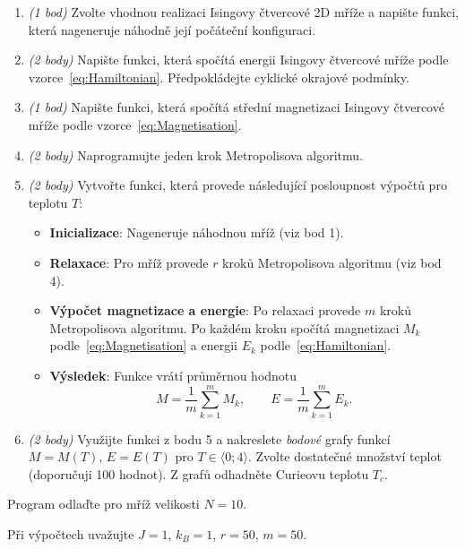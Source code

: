 \documentclass[a4paper,11pt,twoside]{article}
\begin{document}
\begin{enumerate}
    \item \emph{(1 bod)} Zvolte vhodnou realizaci Isingovy čtvercové 2D mříže a napište funkci, která nageneruje náhodně její počáteční konfiguraci.
    
    \item \emph{(2 body)} Napište funkci, která spočítá energii Isingovy čtvercové mříže podle vzorce~\eqref{eq:Hamiltonian}.
		Předpokládejte cyklické okrajové podmínky.

    \item \emph{(1 bod)} Napište funkci, která spočítá střední magnetizaci Isingovy čtvercové mříže podle vzorce~\eqref{eq:Magnetisation}.
    
    \item \emph{(2 body)} Naprogramujte jeden krok Metropolisova algoritmu.
    
    \item \emph{(2 body)} Vytvořte funkci, která provede následující posloupnost výpočtů pro teplotu $T$:
    \begin{itemize}
		\item {\bf Inicializace}: Nageneruje náhodnou mříž (viz bod 1).
		\item {\bf Relaxace}: Pro mříž provede $r$ kroků Metropolisova algoritmu (viz bod 4).
		\item {\bf Výpočet magnetizace a energie}: Po relaxaci provede $m$ kroků Metropolisova algoritmu.
			Po každém kroku spočítá magnetizaci $M_k$ podle~\eqref{eq:Magnetisation} a energii $E_k$ podle~\eqref{eq:Hamiltonian}.
		\item {\bf Výsledek}: Funkce vrátí průměrnou hodnotu 
		\begin{equation}
			M=\frac{1}{m}\sum_{k=1}^{m}M_{k},\qquad E=\frac{1}{m}\sum_{k=1}^{m}E_{k}.
		\end{equation}
	\end{itemize}
	
	\item \emph{(2 body)} Využijte funkci z bodu 5 a nakreslete \emph{bodové} grafy funkcí $M=M(T)$, $E=E(T)$ pro $T\in\langle 0;4\rangle$.
		Zvolte dostatečné množství teplot (doporučuji 100 hodnot).
		Z grafů odhadněte Curieovu teplotu $T_{c}$.

\end{enumerate}

Program odlaďte pro mříž velikosti $N=10$.

Při výpočtech uvažujte $J=1$, $k_{B}=1$, $r=50$, $m=50$.
\end{document}
